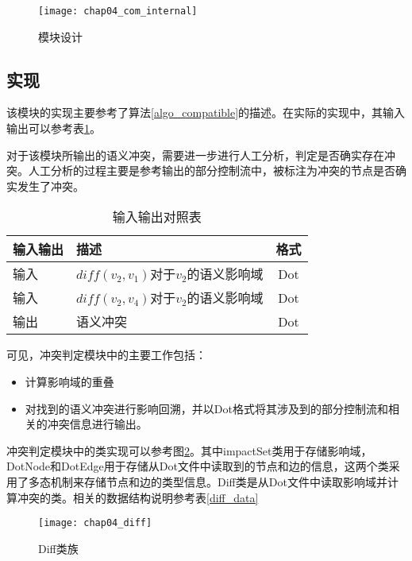 \begin{figure}[H]
	\centering
	\texttt{[image: chap04\_com\_internal]}
	\caption {模块设计}
	\label {des_com}	
\end{figure}

\subsection{实现}

该模块的实现主要参考了算法\ref {algo_compatible}的描述。在实际的实现中，其输入输出可以参考表\ref {com_io2}。

对于该模块所输出的语义冲突，需要进一步进行人工分析，判定是否确实存在冲突。人工分析的过程主要是参考输出的部分控制流中，被标注为冲突的节点是否确实发生了冲突。

\begin{table}[H]
	\caption{输入输出对照表}
	\label{com_io2}
	\centering
	\begin{tabular}{llc}
		\toprule[1.5pt]
		{\heiti 输入输出} & {\heiti 描述} & {\heiti 格式}\\\midrule[1pt]
		输入 & $diff(v_2,v_1)$对于$v_2$的语义影响域 & Dot\\
		输入 & $diff(v_2,v_4)$对于$v_2$的语义影响域 & Dot\\
		输出 & 语义冲突 & Dot \\
		\bottomrule[1.5pt]
	\end{tabular}
\end{table}

可见，冲突判定模块中的主要工作包括：
\begin{itemize}
	\item 计算影响域的重叠
	\item 对找到的语义冲突进行影响回溯，并以Dot格式将其涉及到的部分控制流和相关的冲突信息进行输出。
\end{itemize}

冲突判定模块中的类实现可以参考图\ref {diff}。其中impactSet类用于存储影响域，DotNode和DotEdge用于存储从Dot文件中读取到的节点和边的信息，这两个类采用了多态机制来存储节点和边的类型信息。Diff类是从Dot文件中读取影响域并计算冲突的类。相关的数据结构说明参考表\ref {diff_data}

\begin{figure}[H]
	\centering
	\texttt{[image: chap04\_diff]}
	\caption {Diff类族}
	\label {diff}	
\end{figure}

